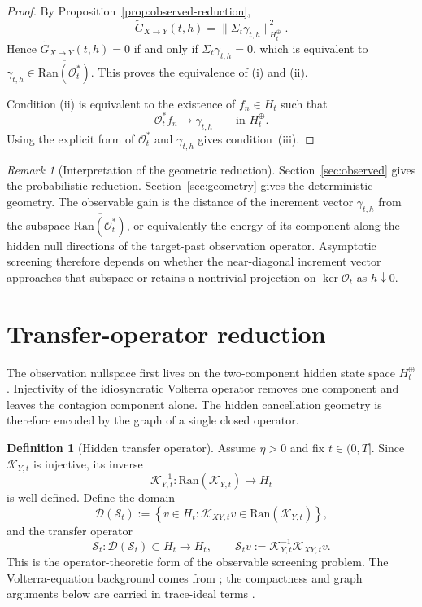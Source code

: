 \documentclass[11pt,a4paper]{amsart}
\theoremstyle{plain}
\theoremstyle{definition}
\newtheorem{definition}[theorem]{Definition}
\theoremstyle{remark}
\newtheorem{remark}[theorem]{Remark}
\begin{document}
\begin{proof}
By Proposition~\ref{prop:observed-reduction},
\[
\widetilde G_{X\to Y}(t,h)=\|\Sigma_t\gamma_{t,h}\|_{H_t^\oplus}^2.
\]
Hence $\widetilde G_{X\to Y}(t,h)=0$ if and only if $\Sigma_t\gamma_{t,h}=0$, which is
equivalent to $\gamma_{t,h}\in\overline{\mathrm{Ran}(\mathcal O_t^*)}$. This proves the
equivalence of (i) and (ii).

Condition (ii) is equivalent to the existence of $f_n\in H_t$ such that
\[
\mathcal O_t^*f_n\to \gamma_{t,h}
\qquad\text{in }H_t^\oplus.
\]
Using the explicit form of $\mathcal O_t^*$ and $\gamma_{t,h}$ gives condition~(iii).
\end{proof}

\begin{remark}[Interpretation of the geometric reduction]
Section~\ref{sec:observed} gives the probabilistic reduction.  Section~\ref{sec:geometry} gives
the deterministic geometry.  The observable gain is the distance of the increment vector
$\gamma_{t,h}$ from the subspace $\overline{\mathrm{Ran}(\mathcal O_t^*)}$, or equivalently the
energy of its component along the hidden null directions of the target-past observation operator.
Asymptotic screening therefore depends on whether the near-diagonal increment vector approaches
that subspace or retains a nontrivial projection on $\ker \mathcal O_t$ as $h\downarrow0$.
\end{remark}

\section{Transfer-operator reduction}\label{sec:transfer}

The observation nullspace first lives on the two-component hidden state space $H_t^\oplus$.
Injectivity of the idiosyncratic Volterra operator removes one component and leaves the contagion
component alone.  The hidden cancellation geometry is therefore encoded by the graph of a single
closed operator.

\begin{definition}[Hidden transfer operator]\label{def:transfer}
Assume $\eta>0$ and fix $t\in(0,T]$. Since $\mathcal K_{Y,t}$ is injective, its inverse
\[
\mathcal K_{Y,t}^{-1}:\mathrm{Ran}(\mathcal K_{Y,t})\to H_t
\]
is well defined. Define the domain
\begin{equation}\label{eq:domainS}
\mathcal D(\mathcal S_t)
:=
\left\{
v\in H_t:\mathcal K_{XY,t}v\in \mathrm{Ran}(\mathcal K_{Y,t})
\right\},
\end{equation}
and the transfer operator
\begin{equation}\label{eq:St}
\mathcal S_t:\mathcal D(\mathcal S_t)\subset H_t\to H_t,
\qquad
\mathcal S_t v:=\mathcal K_{Y,t}^{-1}\mathcal K_{XY,t}v.
\end{equation}
\noindent
This is the operator-theoretic form of the observable screening problem.  The Volterra-equation
background comes from \cite{GLS90}; the compactness and graph arguments below are carried in
trace-ideal terms \cite{Sim05}.
\end{definition}
\end{document}
